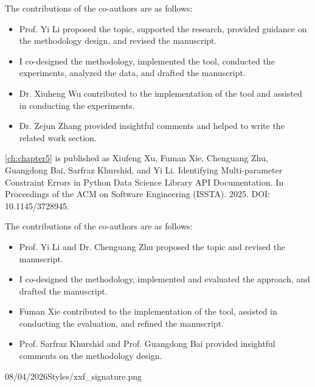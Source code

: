 \documentclass[12pt,a4paper]{Thesis} %
\begin{document}
{	The contributions of the co-authors are as follows:
	\begin{itemize}[topsep=1pt,itemsep=1pt,partopsep=1pt, parsep=1pt]
		\item Prof. Yi Li proposed the topic, supported the research, provided guidance on the methodology design, and revised the manuscript.
		\item I co-designed the methodology, implemented the tool, conducted the experiments, analyzed the data, and drafted the manuscript.
		\item Dr. Xiuheng Wu contributed to the implementation of the tool and assisted in conducting the experiments.
		\item Dr. Zejun Zhang provided insightful comments and helped to write the related work section.
	\end{itemize}

	\cref{ch:chapter5} is published as {\color{blue}Xiufeng Xu, Fuman Xie, Chenguang Zhu, Guangdong Bai, Sarfraz Khurshid, and Yi Li. Identifying Multi-parameter Constraint Errors in Python Data Science Library API Documentation. In Proceedings of the ACM on Software Engineering (ISSTA). 2025. DOI: 10.1145/3728945.}
	
	The contributions of the co-authors are as follows:
	\begin{itemize}[topsep=1pt,itemsep=1pt,partopsep=1pt, parsep=1pt]
		\item Prof. Yi Li and Dr. Chenguang Zhu proposed the topic and revised the manuscript.
		\item I co-designed the methodology, implemented and evaluated the approach, and drafted the manuscript.
		\item Fuman Xie contributed to the implementation of the tool, assisted in conducting the evaluation, and refined the manuscript.
		\item Prof. Sarfraz Khurshid and Prof. Guangdong Bai provided insightful comments on the methodology design.
	\end{itemize}

}{08/04/2026}{Styles/xxf_signature.png}


\end{document}

